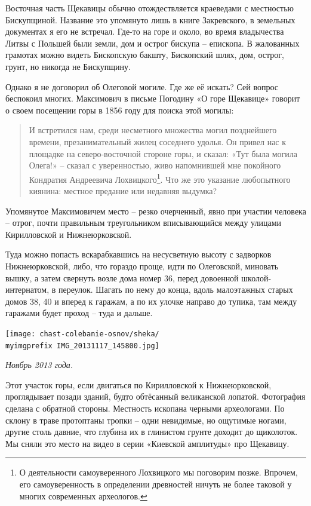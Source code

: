 Восточная часть Щекавицы обычно отождествляется краеведами с местностью Бискупщиной. Название это упомянуто лишь в книге Закревского, в земельных документах я его не встречал. Где-то на горе и около, во время владычества Литвы с Польшей были земли, дом и острог бискупа – епископа. В жалованных грамотах можно видеть Бископскую бакшту, Бископский шлях, дом, острог, грунт, но никогда не Бискупщину.

Однако я не договорил об Олеговой могиле. Где же её искать? Сей вопрос беспокоил многих. Максимович в письме Погодину «О горе Щекавице» говорит о своем посещении горы в 1856 году для поиска этой могилы:

\begin{quotation}
И встретился нам, среди несметного множества могил позднейшего времени, презанимательный жилец соседнего удолья. Он привел нас к площадке на северо-восточной стороне горы, и сказал: «Тут была могила Олега!» – сказал с уверенностью, живо напомнившей мне покойного Кондратия Андреевича Лохвицкого\footnote{О деятельности самоуверенного Лохвицкого мы поговорим позже. Впрочем, его самоуверенность в определении древностей ничуть не более таковой у многих современных археологов.}. Что же это указание любопытного киянина: местное предание или недавняя выдумка?
\end{quotation}

Упомянутое Максимовичем место – резко очерченный, явно при участии человека – отрог, почти правильным треугольником вписывающийся между улицами Кирилловской и Нижнеюрковской. 

Туда можно попасть вскарабкавшись на несусветную высоту с задворков Нижнеюрковской, либо, что гораздо проще, идти по Олеговской, миновать вышку, а затем свернуть возле дома номер 36, перед довоенной школой-интернатом, в переулок. Шагать по нему до конца, вдоль малоэтажных старых домов 38, 40 и вперед к гаражам, а по их улочке направо до тупика, там между гаражами будет проход – туда и дальше. 

\begin{center}
\texttt{[image: chast-colebanie-osnov/sheka/\\myimgprefix IMG\_20131117\_145800.jpg]}

\textit{Ноябрь 2013 года.}
\end{center}

Этот участок горы, если двигаться по Кирилловской к Нижнеюрковской, проглядывает позади зданий, будто обтёсанный великанской лопатой. Фотография сделана с обратной стороны. Местность ископана черными археологами. По склону в траве протоптаны тропки – одни невидимые, но ощутимые ногами, другие столь давние, что глубина их в глинистом грунте доходит до щиколоток. Мы сняли это место на видео в серии «Киевской амплитуды» про Щекавицу.
  
